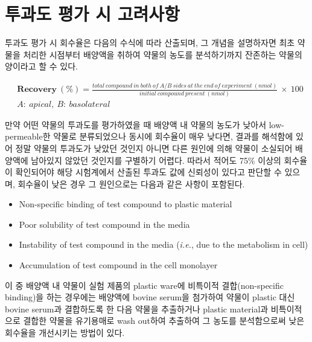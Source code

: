 \documentclass[
  11pt,
  krantz2, a4paper, twoside]{krantz}
\providecommand{\tightlist}{%
  \setlength{\itemsep}{0pt}\setlength{\parskip}{0pt}}
\begin{document}
\section{투과도 평가 시 고려사항}\label{uxd22cuxacfcuxb3c4-uxd3c9uxac00-uxc2dc-uxace0uxb824uxc0acuxd56d}

투과도 평가 시 회수율은 다음의 수식에 따라 산출되며, 그 개념을
설명하자면 최초 약물을 처리한 시점부터 배양액을 취하여 약물의 농도를
분석하기까지 잔존하는 약물의 양이라고 할 수 있다.

\footnotesize

\begin{equation}
\begin{split}
&\mathbf{Recovery\ }(\mathbf{\%}) = \frac{total\ compound\ in\ both\ of\ A/B\ sides\ at\ the\ end\ of\ experiment\ (nmol)}{initial\ compound\ present\ (nmol)}\  \times \ 100 \\
&A:\ apical,\ B:\ basolateral
\end{split}
\label{eq:eq02-03}
\end{equation}

\normalsize

만약 어떤 약물의 투과도를 평가하였을 때 배양액 내 약물의 농도가 낮아서
low-permeable한 약물로 분류되었으나 동시에 회수율이 매우 낮다면, 결과를
해석함에 있어 정말 약물의 투과도가 낮았던 것인지 아니면 다른 원인에 의해
약물이 소실되어 배양액에 남아있지 않았던 것인지를 구별하기 어렵다.
따라서 적어도 75\% 이상의 회수율이 확인되어야 해당 시험계에서 산출된
투과도 값에 신뢰성이 있다고 판단할 수 있으며, 회수율이 낮은 경우 그
원인으로는 다음과 같은 사항이 포함된다.

\begin{itemize}
\tightlist
\item
  Non-specific binding of test compound to plastic material
\item
  Poor solubility of test compound in the media
\item
  Instability of test compound in the media (\emph{i.e.}, due to the
  metabolism in cell)
\item
  Accumulation of test compound in the cell monolayer
\end{itemize}

이 중 배양액 내 약물이 실험 제품의 plastic ware에 비특이적
결합(non-specific binding)을 하는 경우에는 배양액에 bovine serum을
첨가하여 약물이 plastic 대신 bovine serum과 결합하도록 한 다음 약물을
추출하거나 plastic material과 비특이적으로 결합한 약물을 유기용매로 wash
out하여 추출하여 그 농도를 분석함으로써 낮은 회수율을 개선시키는 방법이
있다.
\end{document}
